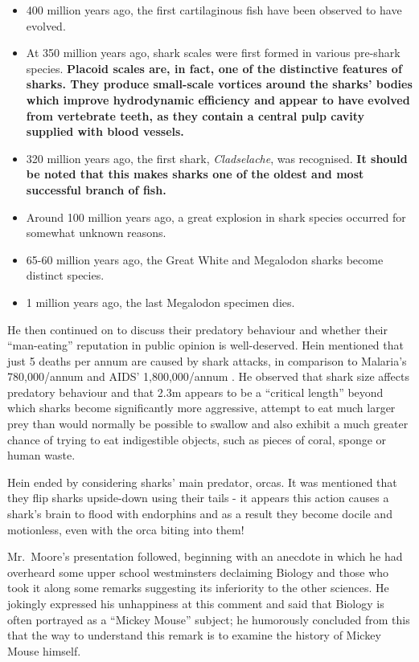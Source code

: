\begin{itemize}
\item
  400 million years ago, the first cartilaginous fish have been observed
  to have evolved.
\item
  At 350 million years ago, shark scales were first formed in various
  pre-shark species.
  \textbf{Placoid scales are, in fact, one of the distinctive features of sharks. They produce small-scale vortices around the sharks’ bodies which improve hydrodynamic efficiency and appear to have evolved from vertebrate teeth, as they contain a central pulp cavity supplied with blood vessels.}
\item
  320 million years ago, the first shark, \textit{Cladselache}, was
  recognised.
  \textbf{It should be noted that this makes sharks one of the oldest and most successful branch of fish.}
\item
  Around 100 million years ago, a great explosion in shark species
  occurred for somewhat unknown reasons.
\item
  65-60 million years ago, the Great White and Megalodon sharks become
  distinct species.
\item
  1 million years ago, the last Megalodon specimen dies.
\end{itemize}

He then continued on to discuss their predatory behaviour and whether
their ``man-eating'' reputation in public opinion is well-deserved. Hein
mentioned that just 5 deaths per annum are caused by shark attacks, in
comparison to Malaria's 780,000/annum and AIDS' 1,800,000/annum
.
He observed that shark size affects predatory behaviour and that 2.3m
appears to be a ``critical length'' beyond which sharks become
significantly more aggressive, attempt to eat much larger prey than
would normally be possible to swallow and also exhibit a much greater
chance of trying to eat indigestible objects, such as pieces of coral,
sponge or human waste.

Hein ended by considering sharks' main predator, orcas. It was mentioned
that they flip sharks upside-down using their tails - it appears this
action causes a shark's brain to flood with endorphins and as a result
they become docile and motionless, even with the orca biting into them!

Mr.~Moore's presentation followed, beginning with an anecdote in which
he had overheard some upper school westminsters declaiming Biology and
those who took it along some remarks suggesting its inferiority to the
other sciences. He jokingly expressed his unhappiness at this comment
and said that Biology is often portrayed as a ``Mickey Mouse'' subject;
he humorously concluded from this that the way to understand this remark
is to examine the history of Mickey Mouse himself.

